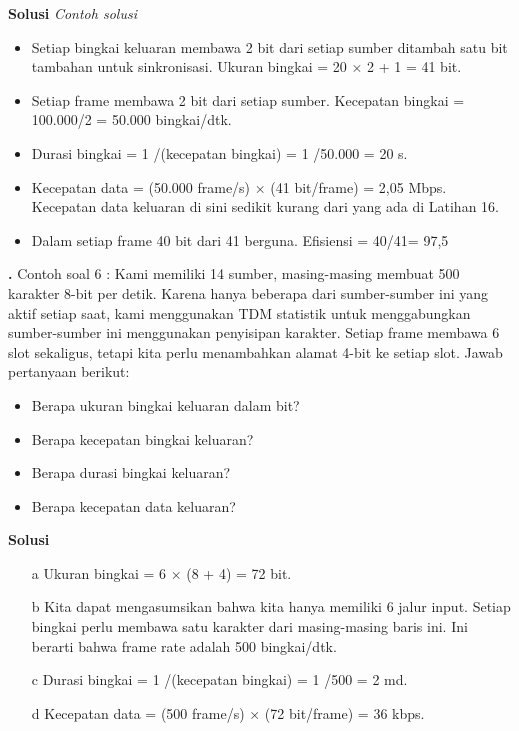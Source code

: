 \documentclass[oneside]{book}
\newcommand{\exercisename}{Latihan}
\newcommand{\solutionname}{Solusi}
\newcounter{exer}[chapter]
\renewcommand{\theexer}{\thechapter.\arabic{exer}}
\newenvironment{exercise}[1][]{
  \refstepcounter{exer}
  \par\noindent\textbf{\color{main}{\exercisename} \theexer #1 }\rmfamily}{
  \par\ignorespacesafterend}
\newenvironment{solution}{\par\noindent\textbf{\color{main}\solutionname} \em}{\par}
\begin{document}
\begin{solution}
  Contoh solusi

\begin{itemize}
  \item Setiap bingkai keluaran membawa 2 bit dari setiap sumber ditambah satu bit tambahan untuk sinkronisasi. Ukuran bingkai = 20 × 2 + 1 = 41 bit.
  \item Setiap frame membawa 2 bit dari setiap sumber. Kecepatan bingkai = 100.000/2 = 50.000 bingkai/dtk.
  \item Durasi bingkai = 1 /(kecepatan bingkai) = 1 /50.000 = 20 s.
  \item Kecepatan data = (50.000 frame/s) × (41 bit/frame) = 2,05 Mbps. Kecepatan data keluaran di sini sedikit kurang dari yang ada di Latihan 16.
  \item Dalam setiap frame 40 bit dari 41 berguna. Efisiensi = 40/41= 97,5%
\end{itemize}	

\end{solution}

\vspace{12pt}

\begin{exercise}
  Contoh soal 6 : Kami memiliki 14 sumber, masing-masing membuat 500 karakter 8-bit per detik. 
  Karena hanya beberapa dari sumber-sumber ini yang aktif setiap saat, kami menggunakan TDM statistik untuk menggabungkan sumber-sumber ini menggunakan penyisipan karakter. Setiap frame membawa 6 slot sekaligus, tetapi kita perlu menambahkan alamat 4-bit ke setiap slot. Jawab pertanyaan berikut:
\end{exercise}
  \begin{itemize}
      \item  Berapa ukuran bingkai keluaran dalam bit?
      \item  Berapa kecepatan bingkai keluaran?
      \item  Berapa durasi bingkai keluaran?
      \item Berapa kecepatan data keluaran?
    \end{itemize}

\begin{solution}
  
\begin{itemize}
\item [a] Ukuran bingkai = 6 × (8 + 4) = 72 bit.
\item [b] Kita dapat mengasumsikan bahwa kita hanya memiliki 6 jalur input. Setiap bingkai perlu membawa satu  karakter dari masing-masing baris ini. Ini berarti bahwa frame rate adalah 500 bingkai/dtk.
\item [c] Durasi bingkai = 1 /(kecepatan bingkai) = 1 /500 = 2 md.
\item [d] Kecepatan data = (500 frame/s) × (72 bit/frame) = 36 kbps.
\end{itemize}
\end{solution}
\end{document}
